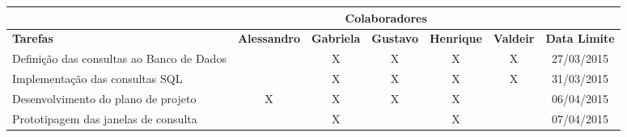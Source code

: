 \documentclass[a4paper,12pt]{article}
\begin{document}
\begin{longtable}{|p{3cm}|c|c|c|c|c|c|}


\hline
& \multicolumn{5}{c|}{\textbf{Colaboradores}}                                                                                                                                                                   & \multicolumn{1}{l|}{}                     \\ \hline
\textbf{Tarefas}                          & \multicolumn{1}{l|}{\textbf{Alessandro}} & \multicolumn{1}{l|}{\textbf{Gabriela}} & \multicolumn{1}{l|}{\textbf{Gustavo}} & \multicolumn{1}{l|}{\textbf{Henrique}} & \multicolumn{1}{l|}{\textbf{Valdeir}} & \multicolumn{1}{l|}{\textbf{Data Limite}} \\ \hline
Definição das consultas ao Banco de Dados &                                          & X                                      & X                                     & X                                      & X                                     & 27/03/2015                                \\ \hline
Implementação das consultas SQL           &                                          & X                                      & X                                     & X                                      & X                                     & 31/03/2015                                \\ \hline
Desenvolvimento do plano de projeto       & X                                        & X                                      & X                                     & X                                      &                                       & 06/04/2015                                \\ \hline
Prototipagem das janelas de consulta      &                                          & X                                      &                                       & X                                      &                                       & 07/04/2015                                \\ \hline


\end{longtable}
\end{document}
